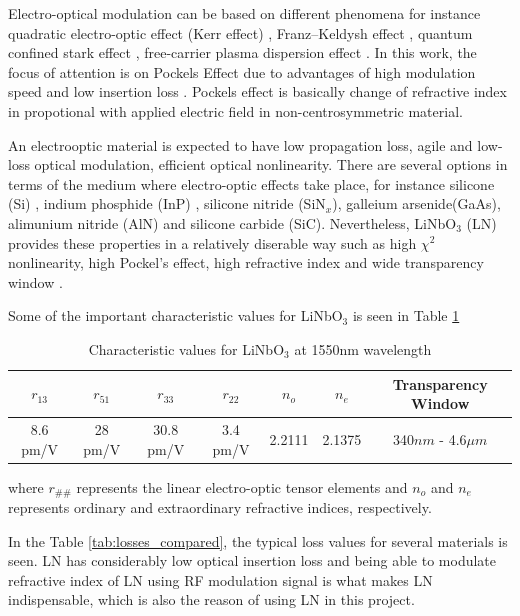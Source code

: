 \documentclass[thesis]{deutez}
\begin{document}
    Electro-optical modulation can be based on different phenomena for instance 
    quadratic electro-optic effect (Kerr effect) \cite{4}, Franz–Keldysh effect \cite{5}, quantum confined stark effect \cite{5}, free-carrier plasma dispersion effect \cite{3}. In this work, the focus of attention is on Pockels Effect due to advantages of high modulation speed and low insertion loss \cite{5}. Pockels effect is basically change of refractive index in propotional with applied electric field in non-centrosymmetric material. 
     
    An electrooptic material is expected to have low propagation loss, agile and low-loss optical modulation, efficient optical nonlinearity. There are several options in terms of the medium where electro-optic effects take place, for instance silicone (Si) \cite{6}, indium phosphide (InP) \cite{7}, silicone nitride (SiN$_x$), galleium arsenide(GaAs), alimunium nitride (AlN) and silicone carbide (SiC). Nevertheless, LiNbO$_3$ (LN) provides these properties in a relatively diserable way such as high $\chi^2$ nonlinearity, high Pockel's effect, high refractive index and wide transparency window \cite{1}. 
    
    Some of the important characteristic values for LiNbO$_3$ is seen in Table \ref{tab:ln_characteristics}

    \begin{table}[h]
        \centering
        \begin{tabular}{c|c|c|c|c|c|c}
            $r_{13}$ & $r_{51}$ & $r_{33}$ & $r_{22}$ & $n_o$ & $n_e$ & Transparency Window \\ \hline
            8.6 pm/V & 28 pm/V & 30.8 pm/V & 3.4 pm/V& 2.2111 & 2.1375 & 340$nm$ - 4.6$\mu m$
        \end{tabular}
        \caption{Characteristic values for LiNbO$_3$ at 1550nm wavelength \cite{8}}
        \label{tab:ln_characteristics}
    \end{table}


    where $r_{\#\#}$ represents the linear electro-optic tensor elements and $n_o$ and $n_e$ represents ordinary and extraordinary refractive indices, respectively. 

    \newpage
    
    In the Table \ref{tab:losses_compared}, the typical loss values for several materials is seen. LN has considerably low optical insertion loss and being able to modulate refractive index of LN using  RF modulation signal \cite{9} is what makes LN indispensable, which is also the reason of using LN in this project. 
    
\end{document}
